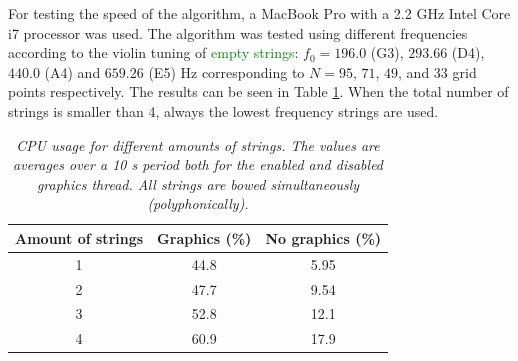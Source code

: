 \documentclass[twoside,a4paper,dvipsnames]{article}
\def\SWcomment[#1]{\textcolor{Green}{#1}}
\begin{document}
For testing the speed of the algorithm, a MacBook Pro with a 2.2 GHz Intel Core i7 processor was used. The algorithm was tested using different frequencies according to the violin tuning of \SWcomment[empty strings]: $f_0 = 196.0$ (G3), $293.66$ (D4), $440.0$ (A4) and $659.26$ (E5) Hz corresponding to $N = 95$, $71$, $49$, and $33$ grid points respectively. The results can be seen in Table \ref{tab:results}. When the total number of strings is smaller than 4, always the lowest frequency strings are used.
   

\begin{table}[ht]
  \caption{{\it CPU usage for different amounts of strings. The values are averages over a 10 s period both for the enabled and disabled graphics thread. All strings are bowed simultaneously (polyphonically).}}
	\centering
  \begin{tabular}{|c|c|c|}\hline
   
    Amount of strings & Graphics (\%) & No graphics (\%)\\
    \hline
    1 & 44.8 & 5.95\\
    2 & 47.7 & 9.54\\
    3 & 52.8 & 12.1 \\
    4 & 60.9 & 17.9\\
    \hline
 \end{tabular}
  \label{tab:results}
\end{table}
\end{document}
